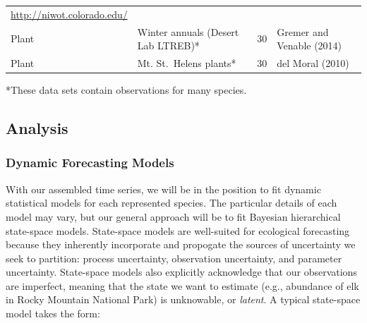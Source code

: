 \documentclass[12pt,]{article}
\begin{document}
\begin{longtable}[]{@{}llll@{}}
\begin{minipage}[t]{0.28\columnwidth}
\url{http://niwot.colorado.edu/}\strut
\end{minipage}\tabularnewline
\begin{minipage}[t]{0.06\columnwidth}\raggedright\strut
Plant\strut
\end{minipage} & \begin{minipage}[t]{0.32\columnwidth}\raggedright\strut
Winter annuals (Desert Lab LTREB)*\strut
\end{minipage} & \begin{minipage}[t]{0.22\columnwidth}\raggedright\strut
30\strut
\end{minipage} & \begin{minipage}[t]{0.28\columnwidth}\raggedright\strut
Gremer and Venable (2014)\strut
\end{minipage}\tabularnewline
\begin{minipage}[t]{0.06\columnwidth}\raggedright\strut
Plant\strut
\end{minipage} & \begin{minipage}[t]{0.32\columnwidth}\raggedright\strut
Mt. St.~Helens plants*\strut
\end{minipage} & \begin{minipage}[t]{0.22\columnwidth}\raggedright\strut
30\strut
\end{minipage} & \begin{minipage}[t]{0.28\columnwidth}\raggedright\strut
del Moral (2010)\strut
\end{minipage}\tabularnewline
\bottomrule
\end{longtable}

\vspace{-2em}

*These data sets contain observations for many species.

\normalsize

\subsection{Analysis}\subsubsection{Dynamic Forecasting Models}

With our assembled time series, we will be in the position to fit
dynamic statistical models for each represented species. The particular
details of each model may vary, but our general approach will be to fit
Bayesian hierarchical state-space models. State-space models are
well-suited for ecological forecasting because they inherently
incorporate and propogate the sources of uncertainty we seek to
partition: process uncertainty, observation uncertainty, and parameter
uncertainty. State-space models also explicitly acknowledge that our
observations are imperfect, meaning that the state we want to estimate
(e.g., abundance of elk in Rocky Mountain National Park) is unknowable,
or \emph{latent}. A typical state-space model takes the form:
\vspace{-2em}
\end{document}
